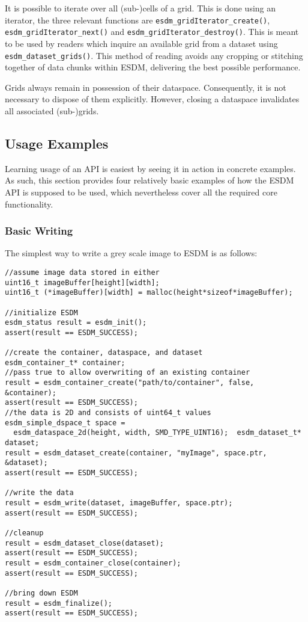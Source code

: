 It is possible to iterate over all (sub-)cells of a grid. 
This is done using an iterator, the three relevant functions are \lstinline|esdm_gridIterator_create()|, \lstinline|esdm_gridIterator_next()| and \lstinline|esdm_gridIterator_destroy()|. 
This is meant to be used by readers which inquire an available grid from a dataset using \lstinline|esdm_dataset_grids()|. 
This method of reading avoids any cropping or stitching together of data chunks within ESDM, delivering the best possible performance.

Grids always remain in possession of their dataspace. Consequently, it is not necessary to dispose of them explicitly. 
However, closing a dataspace invalidates all associated (sub-)grids.

\subsection{Usage Examples}%
\label{sec:user-guides:usage-example}
Learning usage of an API is easiest by seeing it in action in concrete examples. 
As such, this section provides four relatively basic examples of how the ESDM API is supposed to be used, which nevertheless cover all the required core functionality.

\subsubsection{Basic Writing}
The simplest way to write a grey scale image to ESDM is as follows:

\begin{lstlisting}
//assume image data stored in either
uint16_t imageBuffer[height][width];
uint16_t (*imageBuffer)[width] = malloc(height*sizeof*imageBuffer);

//initialize ESDM
esdm_status result = esdm_init();
assert(result == ESDM_SUCCESS);

//create the container, dataspace, and dataset
esdm_container_t* container;
//pass true to allow overwriting of an existing container
result = esdm_container_create("path/to/container", false, &container); 
assert(result == ESDM_SUCCESS);
//the data is 2D and consists of uint64_t values
esdm_simple_dspace_t space = 
  esdm_dataspace_2d(height, width, SMD_TYPE_UINT16);  esdm_dataset_t* dataset;
result = esdm_dataset_create(container, "myImage", space.ptr, &dataset);
assert(result == ESDM_SUCCESS);

//write the data
result = esdm_write(dataset, imageBuffer, space.ptr);
assert(result == ESDM_SUCCESS);

//cleanup
result = esdm_dataset_close(dataset);
assert(result == ESDM_SUCCESS);
result = esdm_container_close(container);
assert(result == ESDM_SUCCESS);

//bring down ESDM
result = esdm_finalize();
assert(result == ESDM_SUCCESS);
\end{lstlisting}

